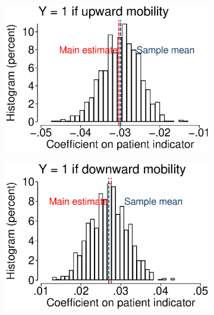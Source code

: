 \documentclass[12pt,english]{article}
\begin{document}
\begin{figure}[!ht]
\caption[Randomly assign treatment (=1) to 10\% of siblings 1000 times]{Randomly assign treatment (=1) to 10\% of siblings 1000 times}
\centering
\begin{subfigure}{0.49\textwidth}
	\centering
	\includegraphics[width=1.00\linewidth]{../output/02_appendix/figure_a12_panel_01.eps}
\end{subfigure}
\begin{subfigure}{0.49\textwidth}
	\centering
	\includegraphics[width=1.00\linewidth]{../output/02_appendix/figure_a12_panel_02.eps}
\end{subfigure}
\begin{subfigure}{0.49\textwidth}
	\centering

\end{subfigure}
\end{figure}
\end{document}
